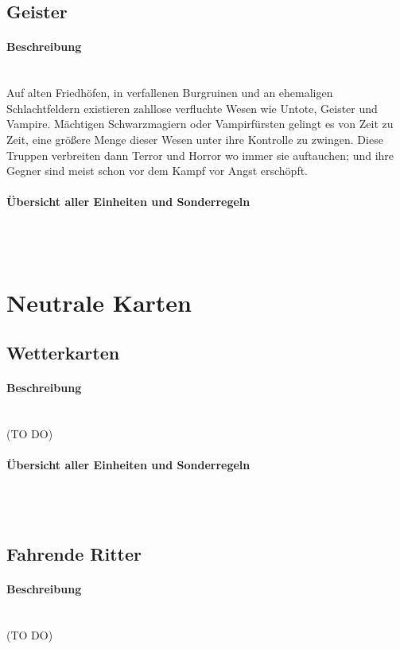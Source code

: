 \documentclass[a4paper,11pt]{report}
\begin{document}
\subsection{Geister}
\paragraph{Beschreibung}~\\
Auf alten Friedhöfen, in verfallenen Burgruinen und an ehemaligen Schlachtfeldern existieren zahllose verfluchte Wesen wie Untote, Geister und Vampire. Mächtigen Schwarzmagiern oder Vampirfürsten gelingt es von Zeit zu Zeit, eine größere Menge dieser Wesen unter ihre Kontrolle zu zwingen. Diese Truppen verbreiten dann Terror und Horror wo immer sie auftauchen; und ihre Gegner sind meist schon vor dem Kampf vor Angst erschöpft.

\paragraph{Übersicht aller Einheiten und Sonderregeln}~\\
\\


\section{Neutrale Karten}
\subsection{Wetterkarten}
\paragraph{Beschreibung}~\\
(TO DO)

\paragraph{Übersicht aller Einheiten und Sonderregeln}~\\
\\


\subsection{Fahrende Ritter}
\paragraph{Beschreibung}~\\
(TO DO)
\end{document}
